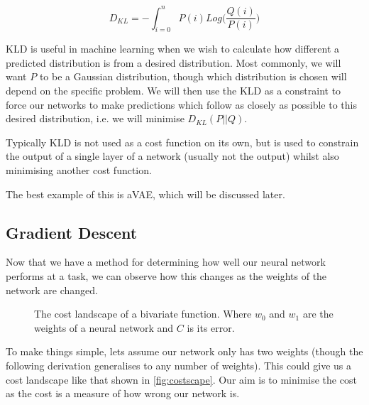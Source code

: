 \begin{equation} \label{eqn:kld}
D_{KL} = -\int_{i=0}^{n}{P(i)Log(\frac{Q(i)}{P(i)}})
\end{equation}

\ac{KLD} is useful in machine learning when we wish to calculate how different a predicted distribution is from a desired distribution. Most commonly, we will want $P$ to be a Gaussian distribution, though which distribution is chosen will depend on the specific problem. We will then use the \ac{KLD} as a constraint to force our networks to make predictions which follow as closely as possible to this desired distribution, i.e. we will minimise $D_{KL}(P||Q)$.

Typically \ac{KLD} is not used as a cost function on its own, but is used to constrain the output of a single layer of a network (usually not the output) whilst also minimising another cost function.

The best example of this is a\ac{VAE}, which will be discussed later.


\subsection{Gradient Descent}
Now that we have a method for determining how well our neural network performs at a task, we can observe how this changes as the weights of the network are changed.


\begin{figure}
\begin{center}
\caption{The cost landscape of a bivariate function. Where $w_0$ and $w_1$ are the weights of a neural network and $C$ is its error.}
\label{fig:costscape}
\end{center}
\end{figure}

To make things simple, lets assume our network only has two weights (though the following derivation generalises to any number of weights). This could give us a cost landscape like that shown in \autoref{fig:costscape}. Our aim is to minimise the cost as the cost is a measure of how wrong our network is.

